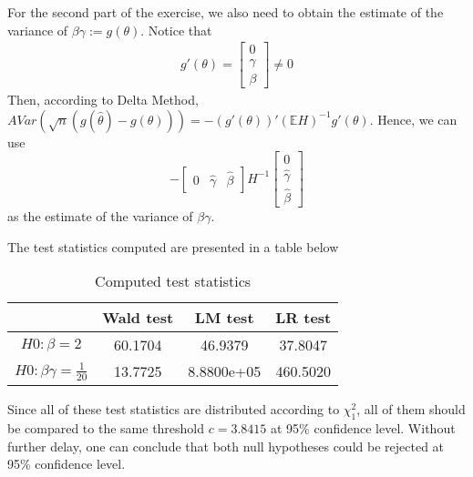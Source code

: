 \documentclass[]{article}
\begin{document}
For the second part of the exercise, we also need to obtain the estimate of the variance of $\beta\gamma:=g(\theta)$. Notice that
\begin{equation}
	\begin{split}
		g'(\theta) = \begin{bmatrix}
			0 \\ \gamma \\ \beta
		\end{bmatrix} \neq 0 \nonumber
	\end{split}
\end{equation}
Then, according to Delta Method, $AVar(\sqrt{n}(g(\hat{\theta}) - g(\theta))) = -(g'(\theta))'(\mathbb{E}H)^{-1}g'(\theta)$. Hence, we can use 
\begin{equation}
	-\begin{bmatrix}
	0 & \hat{\gamma} & \hat{\beta}
	\end{bmatrix}H^{-1}\begin{bmatrix}
	0 \\ \hat{\gamma} \\ \hat{\beta}
	\end{bmatrix} \nonumber
\end{equation}
as the estimate of the variance of $\beta\gamma$.

The test statistics computed are presented in a table below
\begin{table}[h]
	\centering
	\begin{tabular}{c|ccc}
		 & Wald test & LM test & LR test \\ \hline
		$H0: \beta = 2$ & 60.1704 & 46.9379 & 37.8047 \\
		$H0: \beta\gamma = \frac{1}{20}$ & 13.7725 & 8.8800e+05\footnotemark & 460.5020\footnotemark
	\end{tabular}
	\caption{Computed test statistics}
	\label{tab:ex1.2teststat}
\end{table}

Since all of these test statistics are distributed according to $\chi_1^2$, all of them should be compared to the same threshold $c = 3.8415$ at 95\% confidence level. Without further delay, one can conclude that both null hypotheses could be rejected at 95\% confidence level.
\end{document}
